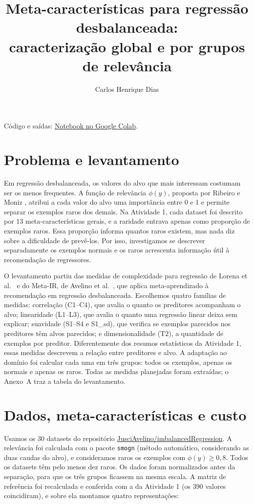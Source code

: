 \documentclass[10pt,a4paper]{article}
\title{Meta-características para regressão desbalanceada:\\caracterização global e por grupos de relevância}
\author{Carlos Henrique Dias}
\date{}
\newcommand{\fonteNotebook}{\href{https://colab.research.google.com/drive/1rmAUTeKFGBM2pG6Rl0QFPk2mKrp471cN?usp=sharing}{Notebook no Google Colab}}
\begin{document}
\maketitle
\vspace{-0.6cm}
\begin{center}\small Código e saídas: \fonteNotebook.\end{center}

\section{Problema e levantamento}

Em regressão desbalanceada, os valores do alvo que mais interessam costumam ser os menos frequentes. A função de relevância $\phi(y)$, proposta por Ribeiro e Moniz \cite{ribeiro}, atribui a cada valor do alvo uma importância entre 0 e 1 e permite separar os exemplos raros dos demais. Na Atividade 1, cada dataset foi descrito por 13 meta-características gerais, e a raridade entrava apenas como proporção de exemplos raros. Essa proporção informa quantos raros existem, mas nada diz sobre a dificuldade de prevê-los. Por isso, investigamos se descrever separadamente os exemplos normais e os raros acrescenta informação útil à recomendação de regressores.

O levantamento partiu das medidas de complexidade para regressão de Lorena et al.\ \cite{lorena} e do Meta-IR, de Avelino et al.\ \cite{avelino}, que aplica meta-aprendizado à recomendação em regressão desbalanceada. Escolhemos quatro famílias de medidas: correlação (C1--C4), que avalia o quanto os preditores acompanham o alvo; linearidade (L1--L3), que avalia o quanto uma regressão linear deixa sem explicar; suavidade (S1--S4 e S1\_sd), que verifica se exemplos parecidos nos preditores têm alvos parecidos; e dimensionalidade (T2), a quantidade de exemplos por preditor. Diferentemente dos resumos estatísticos da Atividade 1, essas medidas descrevem a relação entre preditores e alvo. A adaptação ao domínio foi calcular cada uma em três grupos: todos os exemplos, apenas os normais e apenas os raros. Todas as medidas planejadas foram extraídas; o Anexo~A traz a tabela do levantamento.

\section{Dados, meta-características e custo}

Usamos os 30 datasets do repositório \href{https://github.com/JusciAvelino/imbalancedRegression}{JusciAvelino/imbalancedRegression}. A relevância foi calculada com o pacote \texttt{smogn} (método automático, considerando as duas caudas do alvo), e consideramos raros os exemplos com $\phi(y)\geq0{,}8$. Todos os datasets têm pelo menos dez raros. Os dados foram normalizados antes da separação, para que os três grupos ficassem na mesma escala. A matriz de referência foi recalculada e conferida com a da Atividade 1 (os 390 valores coincidiram), e sobre ela montamos quatro representações:
\end{document}
